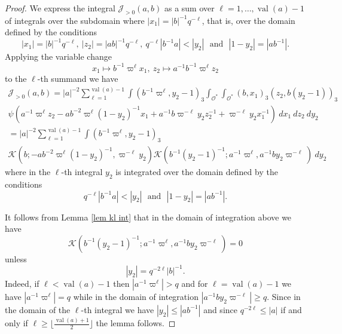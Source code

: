 \documentclass[10pt,a4paper]{amsart}
\newcommand{\J}{\mathcal{J}}
\newcommand{\Kl}{\mathcal{K}}
\newcommand{\abs}[1]{\left|{#1}\right|}
\newcommand{\val}{{\operatorname{val}}}
\renewcommand{\O}{\mathcal{O}}
\begin{document}
\begin{proof}
We express the integral $\J_{>0}(a,b)$ as a sum over $\ell=1,\dots,\val(a)-1$ of integrals over the subdomain 
where $\abs{x_1}=\abs{b}^{-1}q^{-\ell}$, that is, over the domain defined by the conditions
\[
\abs{x_1}=\abs{b}^{-1}q^{-\ell},\ \abs{z_2}=\abs{ab}^{-1}q^{-\ell},\ q^{-\ell}\abs{b^{-1}a}<\abs{y_2}\ \ \ \text{and}\ \ \ \abs{1-y_2}=\abs{ab^{-1}}.
\]
Applying the variable change
\[
x_1\mapsto b^{-1}\varpi^\ell x_1,\ z_2\mapsto a^{-1}b^{-1}\varpi^\ell z_2
\]
to the $\ell$-th summand we have
\begin{multline*}
\J_{>0}(a,b)=\abs{a}^{-2}\sum_{\ell=1}^{\val(a)-1}\int (b^{-1}\varpi^\ell,y_2-1)_3\int_{\O^*}\int_{\O^*}(b,x_1)_3  (z_2,b(y_2-1))_3  \\ \psi(a^{-1}\varpi^\ell z_2-ab^{-2}\varpi^\ell(1-y_2)^{-1} x_1+a^{-1}b \varpi^{-\ell} y_2 z_2^{-1}+\varpi^{-\ell} y_2x_1^{-1})\ dx_1\ dz_2 \ dy_2\\=
 \abs{a}^{-2}\sum_{\ell=1}^{\val(a)-1}\int  (b^{-1}\varpi^\ell,y_2-1)_3\\ \Kl(b;-ab^{-2}\varpi^\ell(1-y_2)^{-1},\varpi^{-\ell} y_2)\Kl(b^{-1}(y_2-1)^{-1};a^{-1}\varpi^\ell ,a^{-1}by_2\varpi^{-\ell} )\ dy_2
\end{multline*}
where in the $\ell$-th integral $y_2$ is integrated over the domain defined by the conditions
\[
q^{-\ell}\abs{b^{-1}a}<\abs{y_2}\ \ \ \text{and}\ \ \ \abs{1-y_2}=\abs{ab^{-1}}.
\]

It follows from Lemma \ref{lem kl int} that in the domain of integration above we have 
\[
\Kl(b^{-1}(y_2-1)^{-1};a^{-1}\varpi^\ell ,a^{-1}by_2\varpi^{-\ell} )=0
\] 
unless 
\[
\abs{y_2}=q^{-2\ell}\abs{b}^{-1}.
\] 
Indeed, if $\ell<\val(a)-1$ then $\abs{a^{-1}\varpi^\ell}>q$ and for $\ell=\val(a)-1$ we have $\abs{a^{-1}\varpi^\ell}=q$ while in the domain of integration $\abs{a^{-1}by_2\varpi^{-\ell}}\ge q$. Since in the domain of the $\ell$-th integral we have $\abs{y_2}\le \abs{ab^{-1}}$ and since $q^{-2\ell}\le \abs{a}$ if and only if $\ell\ge \lfloor \frac{\val(a)+1}2\rfloor$ the lemma follows.
\end{proof}
\end{document}
